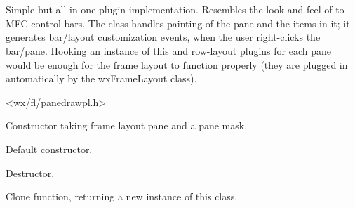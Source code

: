 %
%


\section{}\label{cbpanedrawplugin}


Simple but all-in-one plugin implementation. Resembles the look and feel of
to MFC control-bars. The class handles painting of the pane and the items in it;
it generates bar/layout customization events, when the user right-clicks the bar/pane.
Hooking an instance of this and row-layout plugins for each pane
would be enough for the frame layout to function properly
(they are plugged in automatically by the wxFrameLayout class).




<wx/fl/panedrawpl.h>




\label{cbpanedrawplugincbpanedrawplugin}


Constructor taking frame layout pane and a pane mask.



Default constructor.


\label{cbpanedrawplugindtor}


Destructor.


\label{cbpanedrawpluginclone}


Clone function, returning a new instance of this class.


\label{cbpanedrawplugindrawbarinnershaderect}


